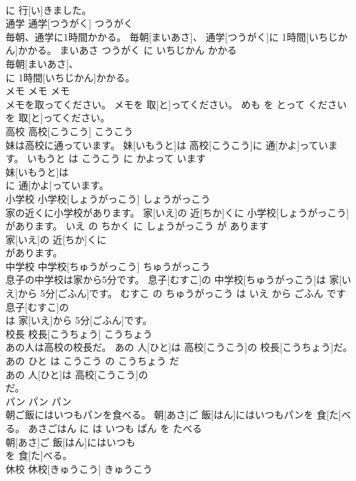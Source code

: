 \documentclass[8pt]{extreport}
\begin{document}
\begin{CJK}{UTF8}{min}
\\	に 行[い]きました。			
\\	通学	通学[つうがく]	つうがく	
\\	毎朝、通学に1時間かかる。	毎朝[まいあさ]、 通学[つうがく]に 1時間[いちじかん]かかる。	まいあさ つうがく に いちじかん かかる	
\\	毎朝[まいあさ]、
\\	に 1時間[いちじかん]かかる。			
\\	メモ	メモ	メモ	
\\	メモを取ってください。	メモを 取[と]ってください。	めも を とって ください	
\\	を 取[と]ってください。			
\\	高校	高校[こうこう]	こうこう	
\\	妹は高校に通っています。	妹[いもうと]は 高校[こうこう]に 通[かよ]っています。	いもうと は こうこう に かよって います	
\\	妹[いもうと]は
\\	に 通[かよ]っています。			
\\	小学校	小学校[しょうがっこう]	しょうがっこう	
\\	家の近くに小学校があります。	家[いえ]の 近[ちか]くに 小学校[しょうがっこう]があります。	いえ の ちかく に しょうがっこう が あります	
\\	家[いえ]の 近[ちか]くに
\\	があります。			
\\	中学校	中学校[ちゅうがっこう]	ちゅうがっこう	
\\	息子の中学校は家から5分です。	息子[むすこ]の 中学校[ちゅうがっこう]は 家[いえ]から 5分[ごふん]です。	むすこ の ちゅうがっこう は いえ から ごふん です	
\\	息子[むすこ]の
\\	は 家[いえ]から 5分[ごふん]です。			
\\	校長	校長[こうちょう]	こうちょう	
\\	あの人は高校の校長だ。	あの 人[ひと]は 高校[こうこう]の 校長[こうちょう]だ。	あの ひと は こうこう の こうちょう だ	
\\	あの 人[ひと]は 高校[こうこう]の
\\	だ。			
\\	パン	パン	パン	
\\	朝ご飯にはいつもパンを食べる。	朝[あさ]ご 飯[はん]にはいつもパンを 食[た]べる。	あさごはん に は いつも ぱん を たべる	
\\	朝[あさ]ご 飯[はん]にはいつも
\\	を 食[た]べる。			
\\	休校	休校[きゅうこう]	きゅうこう	

\end{CJK}
\end{document}
